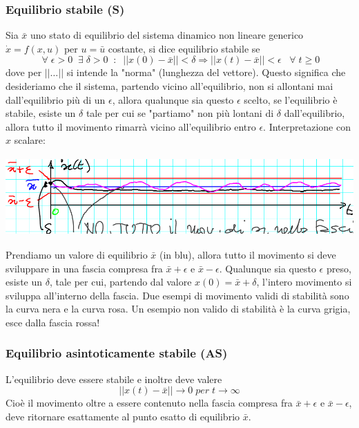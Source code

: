 \subsubsection{Equilibrio stabile (S)}
Sia $\bar{x}$ uno stato di equilibrio del sistema dinamico non lineare generico $\dot{x} = f(x,u)$ per $u = \bar{u}$ costante, si dice equilibrio stabile se
\[
    \;\forall\; \epsilon > 0 \;\; \exists \; \delta > 0 \;\;:\;\; ||x(0) - \bar{x}|| < \delta \Rightarrow  ||x(t) - \bar{x}|| < \epsilon \;\;\;\forall\;t \geq 0
\]
dove per $|| \dots ||$ si intende la "norma" (lunghezza del vettore).\newline
\newline
Questo significa che desideriamo che il sistema, partendo vicino all'equilibrio, non si allontani mai dall'equilibrio più di un $\epsilon$, allora qualunque sia questo $\epsilon$ scelto, se l'equilibrio è stabile, esiste un $\delta$ tale per cui se "partiamo" non più lontani di $\delta$ dall'equilibrio, allora tutto il movimento rimarrà vicino all'equilibrio entro $\epsilon$.\newline
\newline
Interpretazione con $x$ scalare:
\begin{center}
    \includegraphics[height=3cm]{../lezione4/img2.PNG}
\end{center}
Prendiamo un valore di equilibrio $\bar{x}$ (in blu), allora tutto il movimento si deve sviluppare in una fascia compresa fra $\bar{x}+ \epsilon$ e $\bar{x} - \epsilon$. Qualunque sia questo $\epsilon$ preso, esiste un $\delta$, tale per cui, partendo dal valore $x(0) = \bar{x}+ \delta$, l'intero movimento si sviluppa all'interno della fascia. Due esempi di movimento validi di stabilità sono la curva nera e la curva rosa. Un esempio non valido di stabilità è la curva grigia, esce dalla fascia rossa!
\subsubsection{Equilibrio asintoticamente stabile (AS)}
L'equilibrio deve essere stabile e inoltre deve valere
\[
    ||x(t) - \bar{x}|| \rightarrow 0  \;per \; t \rightarrow \infty
\]
Cioè il movimento oltre a essere contenuto nella fascia compresa fra $\bar{x}+ \epsilon$ e $\bar{x} - \epsilon$, deve ritornare esattamente al punto esatto di equilibrio $\bar{x}$.
